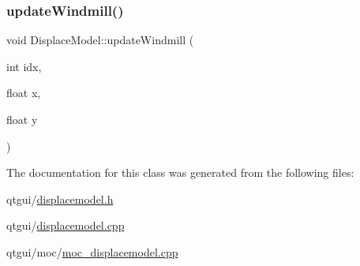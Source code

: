 \mbox{\label{class_displace_model_abaae8b3985bd60919da5d7ccf01c4872}} 
\subsubsection{\texorpdfstring{updateWindmill()}{updateWindmill()}}
{\footnotesize\ttfamily void Displace\+Model\+::update\+Windmill (\begin{DoxyParamCaption}\item[{int}]{idx,  }\item[{float}]{x,  }\item[{float}]{y }\end{DoxyParamCaption})}



The documentation for this class was generated from the following files\+:\begin{DoxyCompactItemize}
\item 
qtgui/\mbox{\hyperlink{displacemodel_8h}{displacemodel.\+h}}\item 
qtgui/\mbox{\hyperlink{displacemodel_8cpp}{displacemodel.\+cpp}}\item 
qtgui/moc/\mbox{\hyperlink{moc__displacemodel_8cpp}{moc\+\_\+displacemodel.\+cpp}}\end{DoxyCompactItemize}
